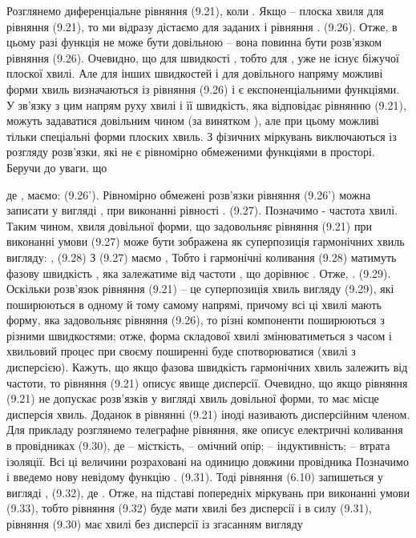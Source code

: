 Розглянемо диференціальне рівняння (9.21), коли  . Якщо   – плоска хвиля для рівняння (9.21), то ми відразу дістаємо для заданих   і   рівняння 
 .          (9.26).
Отже, в цьому разі функція   не може бути довільною – вона повинна бути розв’язком рівняння (9.26). Очевидно, що для швидкості  , тобто для  , уже не існує біжучої плоскої хвилі. Але для інших швидкостей і для довільного напряму можливі форми хвиль визначаються із рівняння (9.26) і є експоненціальними функціями. У зв’язку з цим напрям руху хвилі і її швидкість, яка відповідає рівнянню (9.21), можуть задаватися довільним чином (за винятком  ), але при цьому можливі тільки спеціальні форми плоских хвиль. З фізичних міркувань виключаються із розгляду розв’язки, які не є рівномірно обмеженими функціями в просторі. Беручи до уваги, що
 
де  , маємо:
                                (9.26’).
Рівномірно обмежені розв’язки рівняння (9.26’) можна записати у вигляді  , при виконанні рівності   .           (9.27).
Позначимо   - частота хвилі.
Таким чином, хвиля довільної форми, що задовольняє рівняння (9.21) при виконанні умови (9.27) може бути зображена як суперпозиція гармонічних хвиль вигляду:  ,                             (9.28) 
З (9.27) маємо               ,
Тобто   і гармонічні коливання (9.28) матимуть фазову швидкість  , яка залежатиме від частоти  , що дорівнює     .
Отже,  .                        (9.29).
Оскільки розв’язок рівняння (9.21) – це суперпозиція хвиль вигляду (9.29), які поширюються в одному й тому самому напрямі, причому всі ці хвилі мають форму, яка задовольняє рівняння (9.26), то різні компоненти поширюються з різними швидкостями; отже, форма складової хвилі   змінюватиметься з часом   і хвильовий процес при своєму поширенні буде спотворюватися (хвилі з дисперсією). Кажуть, що якщо фазова швидкість гармонічних хвиль залежить від частоти, то рівняння (9.21) описує явище дисперсії.
Очевидно, що якщо рівняння (9.21) не допускає розв’язків у вигляді хвиль довільної форми, то має місце дисперсія хвиль. Доданок   в рівнянні (9.21) іноді називають дисперсійним членом.
Для прикладу розглянемо телеграфне рівняння, яке описує електричні коливання в провідниках
            (9.30),
де   – місткість,   – омічний опір;   – індуктивність;   – втрата ізоляції. Всі ці величини розраховані на одиницю довжини провідника Позначимо   і введемо нову невідому функцію
 .                              (9.31).
Тоді рівняння (6.10) запишеться у вигляді
 ,                      (9.32),
де   .
Отже, на підставі попередніх міркувань при виконанні умови 
                                     (9.33), тобто   рівняння (9.32) буде мати хвилі без дисперсії і в силу (9.31), рівняння (9.30) має хвилі без дисперсії із згасанням вигляду
